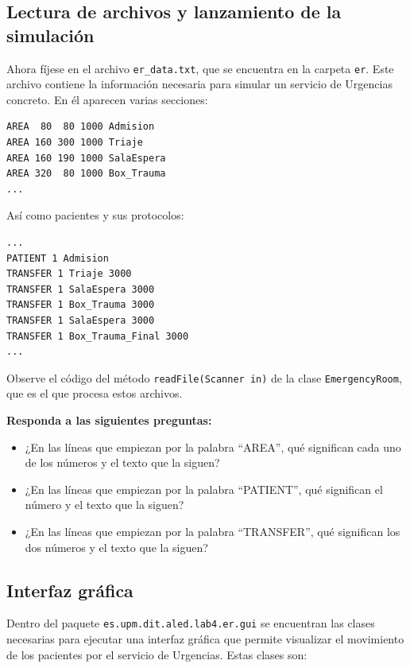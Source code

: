 \documentclass[10pt,a4paper,spanish]{article}
\newcommand{\code}[1]{\texttt{#1}}
\begin{document}
\subsection{Lectura de archivos y lanzamiento de la simulación}
\label{sec:archivo}

Ahora fíjese en el archivo \code{er\_data.txt}, que se encuentra en la carpeta \code{er}. Este archivo contiene la información necesaria para simular un servicio de Urgencias concreto. En él aparecen varias secciones:

\begin{verbatim}
AREA  80  80 1000 Admision
AREA 160 300 1000 Triaje
AREA 160 190 1000 SalaEspera
AREA 320  80 1000 Box_Trauma
...
\end{verbatim}

Así como pacientes y sus protocolos:

\begin{verbatim}
...
PATIENT 1 Admision
TRANSFER 1 Triaje 3000
TRANSFER 1 SalaEspera 3000
TRANSFER 1 Box_Trauma 3000
TRANSFER 1 SalaEspera 3000
TRANSFER 1 Box_Trauma_Final 3000
...
\end{verbatim}

Observe el código del método \code{readFile(Scanner in)} de la clase \code{EmergencyRoom}, que es el que procesa estos archivos.

\textbf{Responda a las siguientes preguntas:}

\begin{itemize}
    \item ¿En las líneas que empiezan por la palabra ``AREA'', qué significan cada uno de los números y el texto que la siguen?
    \item ¿En las líneas que empiezan por la palabra ``PATIENT'', qué significan el número y el texto que la siguen?
    \item ¿En las líneas que empiezan por la palabra ``TRANSFER'', qué significan los dos números y el texto que la siguen?
\end{itemize}

\subsection{Interfaz gráfica}

Dentro del paquete \code{es.upm.dit.aled.lab4.er.gui} se encuentran las clases necesarias para ejecutar una interfaz gráfica que permite visualizar el movimiento de los pacientes por el servicio de Urgencias. Estas clases son:
\end{document}
